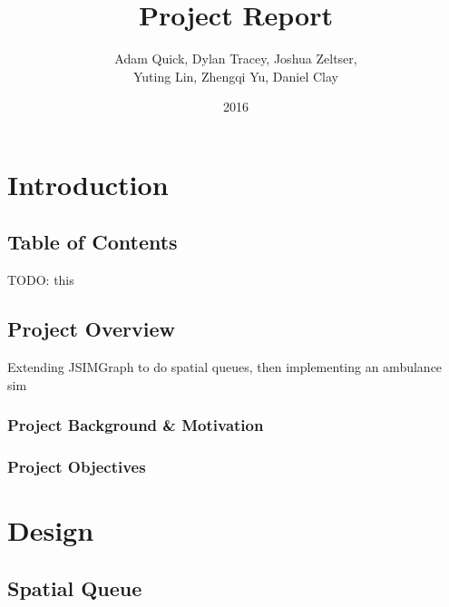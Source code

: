 \documentclass[a4paper]{article}
\begin{document}
\title{Project Report}
\date{2016}
\author{Adam Quick, Dylan Tracey, Joshua Zeltser, \\Yuting Lin, Zhengqi Yu, Daniel Clay}
\maketitle

\section{Introduction}

\subsection{Table of Contents}%

TODO: this

\subsection{Project Overview}%

Extending JSIMGraph to do spatial queues, then implementing an ambulance sim

\subsubsection{Project Background & Motivation}

\subsubsection{Project Objectives}

\section{Design}

\subsection{Spatial Queue}%
\end{document}

